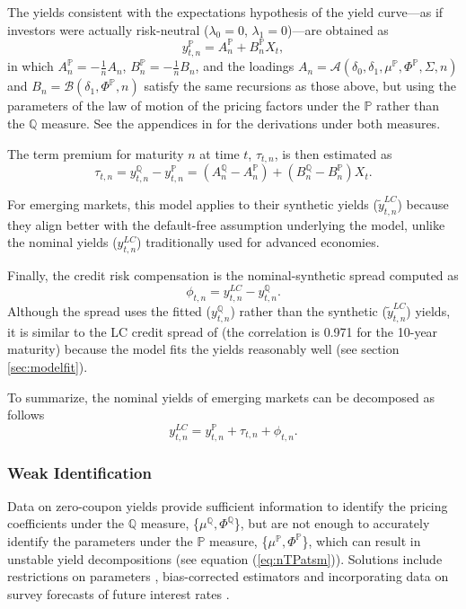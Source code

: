 \documentclass[a4paper, 12pt]{article}
\providecommand{\tnr}{n}
\providecommand{\idxt}{t}
\providecommand{\idxs}{\idxt,\tnr}
\providecommand{\yld}{y}
\providecommand{\yZero}{\yld_{\idxs}}
\providecommand{\yZeroQ}{\yZero^{\Qmeasure}}
\providecommand{\yZeroP}{\yZero^{\Pmeasure}}
\providecommand{\Xvars}{X_{\idxt}}
\providecommand{\affineA}{A_{\tnr}}
\providecommand{\affineB}{B_{\tnr}}
\providecommand{\affineAQ}{\affineA^{\Qmeasure}}
\providecommand{\affineBQ}{\affineB^{\Qmeasure}}
\providecommand{\affineAP}{\affineA^{\Pmeasure}}
\providecommand{\affineBP}{\affineB^{\Pmeasure}}
\providecommand{\yLCnom}{\yld_{\idxs} ^{LC}}
\providecommand{\yLCsynt}{\widetilde{\yld}_{\idxs} ^{LC}}
\providecommand{\Pmeasure}{\mathbb{P}}
\providecommand{\Qmeasure}{\mathbb{Q}}
\providecommand{\termprm}{\tau_{\idxs}}
\providecommand{\lambdazero}{\lambda_{0}}
\providecommand{\lambdaone}{\lambda_{1}}
\providecommand{\CIPdev}{\phi_{\idxs}}
\providecommand{\deltazero}{\delta_{0}}
\providecommand{\deltaone}{\delta_{1}}
\providecommand{\XmuP}{\mu^{\Pmeasure}}
\providecommand{\XmuQ}{\mu^{\Qmeasure}}
\providecommand{\XSigma}{\Sigma}
\providecommand{\XPhiP}{\Phi^{\Pmeasure}}
\providecommand{\XPhiQ}{\Phi^{\Qmeasure}}
\newcommand{\eqCIPdevQ}{\CIPdev = \yLCnom - \yZeroQ}
\newcommand{\eqLCnom}{\yLCnom = \yZeroP + \termprm + \CIPdev} %
\newcommand{\eqyZeroP}{\yZeroP = \affineAP + \affineBP \Xvars}
\newcommand{\eqTP}{\termprm = \yZeroQ - \yZeroP}
\begin{document}
The yields consistent with the expectations hypothesis of the yield curve---as if investors were actually risk-neutral (\(\lambdazero = 0\), \(\lambdaone = 0 \))---are obtained as
\begin{equation*}
\eqyZeroP ,
\end{equation*}
\noindent in which \(\affineAP = - \frac{1}{\tnr} \affineA\), \(\affineBP = - \frac{1}{\tnr} \affineB\), and the loadings \(\affineA = \mathcal{A}(\deltazero, \deltaone, \XmuP, \XPhiP, \XSigma, \tnr)\) and \(\affineB = \mathcal{B}(\deltaone, \XPhiP, \tnr)\) satisfy the same recursions as those above, but using the parameters of the law of motion of the pricing factors under the \(\Pmeasure\) rather than the \(\Qmeasure\) measure. See the appendices in \cite{Lloyd:2020} for the derivations under both measures. 

The term premium for maturity \(\tnr\) at time \(\idxt\), \(\termprm\), is then estimated as 
\begin{equation} \label{eq:nTPatsm}
\eqTP = (\affineAQ - \affineAP) + (\affineBQ  - \affineBP) \Xvars .
\end{equation}

For emerging markets, this model applies to their synthetic yields (\(\yLCsynt\)) because they align better with the default-free assumption underlying the model, unlike the nominal yields (\(\yLCnom\)) traditionally used for advanced economies. 

Finally, the credit risk compensation is the nominal-synthetic spread computed as 
\begin{equation} \label{eq:nCIPdevQ}
\eqCIPdevQ.
\end{equation}
\noindent Although the spread uses the fitted (\(\yZeroQ\)) rather than the synthetic (\(\yLCsynt\)) yields, it is similar to the LC credit spread of \cite{DuSchreger:2016JoF} (the correlation is 0.971 for the 10-year maturity) because the model fits the yields reasonably well (see section \ref{sec:modelfit}). 

To summarize, the nominal yields of emerging markets can be decomposed as follows 
\begin{equation*}
\eqLCnom .
\end{equation*}
\vspace{-1cm}

\subsubsection{Weak Identification} \label{sec:Identification}
Data on zero-coupon yields provide sufficient information to identify the pricing coefficients under the \(\Qmeasure\) measure, \{\(\XmuQ, \XPhiQ\)\}, but are not enough to accurately identify the parameters under the \(\Pmeasure\) measure, \{\(\XmuP, \XPhiP\)\}, which can result in unstable yield decompositions (see equation (\ref{eq:nTPatsm})). Solutions include restrictions on parameters \citep{Duffee:2010}, bias-corrected estimators \citep{BRW:2012} and incorporating data on survey forecasts of future interest rates \citep{KimWright:2005,KimOrphanides:2012}. 
\end{document}
